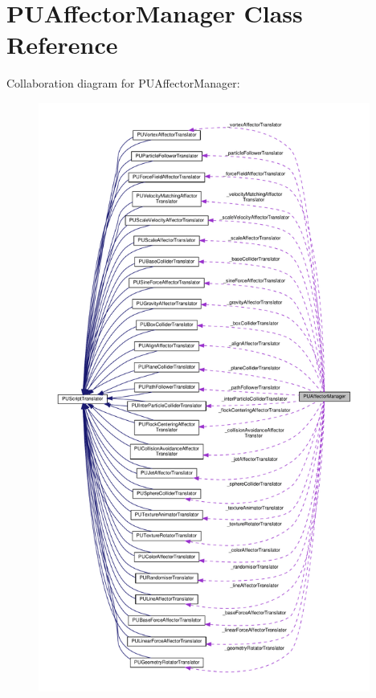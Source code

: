 \hypertarget{classPUAffectorManager}{}\section{P\+U\+Affector\+Manager Class Reference}
\label{classPUAffectorManager}


Collaboration diagram for P\+U\+Affector\+Manager\+:
\nopagebreak
\begin{figure}[H]
\begin{center}
\leavevmode
\includegraphics[height=550pt]{classPUAffectorManager__coll__graph}
\end{center}
\end{figure}
